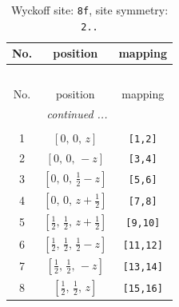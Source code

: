 \documentclass[fleqn,8pt]{jsarticle}
\begin{document}
\begin{longtable}{ccc}
\caption{Wyckoff site: {\tt 8f}, site symmetry: {\tt 2..}}
 \\
 \hline \hline
No. & position & mapping \\ \hline \endfirsthead

\multicolumn{2}{l}{\tablename\ \thetable{}} \\
 \hline \hline
No. & position & mapping \\ \hline \endhead

 \hline \hline
\multicolumn{2}{r}{\footnotesize\it continued ...} \\ \endfoot

 \hline \hline
\multicolumn{2}{r}{} \\ \endlastfoot

1 & $\left[ 0,\, 0,\, z \right]$ & {\tt [1,2]} \\ \hline
2 & $\left[ 0,\, 0,\, - z \right]$ & {\tt [3,4]} \\ \hline
3 & $\left[ 0,\, 0,\, \frac{1}{2} - z \right]$ & {\tt [5,6]} \\ \hline
4 & $\left[ 0,\, 0,\, z + \frac{1}{2} \right]$ & {\tt [7,8]} \\ \hline
5 & $\left[ \frac{1}{2},\, \frac{1}{2},\, z + \frac{1}{2} \right]$ & {\tt [9,10]} \\ \hline
6 & $\left[ \frac{1}{2},\, \frac{1}{2},\, \frac{1}{2} - z \right]$ & {\tt [11,12]} \\ \hline
7 & $\left[ \frac{1}{2},\, \frac{1}{2},\, - z \right]$ & {\tt [13,14]} \\ \hline
8 & $\left[ \frac{1}{2},\, \frac{1}{2},\, z \right]$ & {\tt [15,16]} \\
\end{longtable}
\renewcommand{\arraystretch}{1.2}
\end{document}

